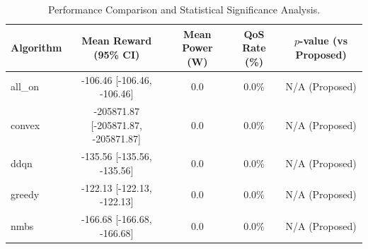 \begin{table}[h]
\centering
\caption{Performance Comparison and Statistical Significance Analysis.}
\begin{tabular}{lcccc}
\hline
Algorithm & Mean Reward (95\% CI) & Mean Power (W) & QoS Rate (\%) & $p$-value (vs Proposed) \\
\hline
all_on & -106.46 [-106.46, -106.46] & 0.0 & 0.0\% & N/A (Proposed) \\
convex & -205871.87 [-205871.87, -205871.87] & 0.0 & 0.0\% & N/A (Proposed) \\
ddqn & -135.56 [-135.56, -135.56] & 0.0 & 0.0\% & N/A (Proposed) \\
greedy & -122.13 [-122.13, -122.13] & 0.0 & 0.0\% & N/A (Proposed) \\
nmbs & -166.68 [-166.68, -166.68] & 0.0 & 0.0\% & N/A (Proposed) \\
\hline
\end{tabular}
\end{table}
